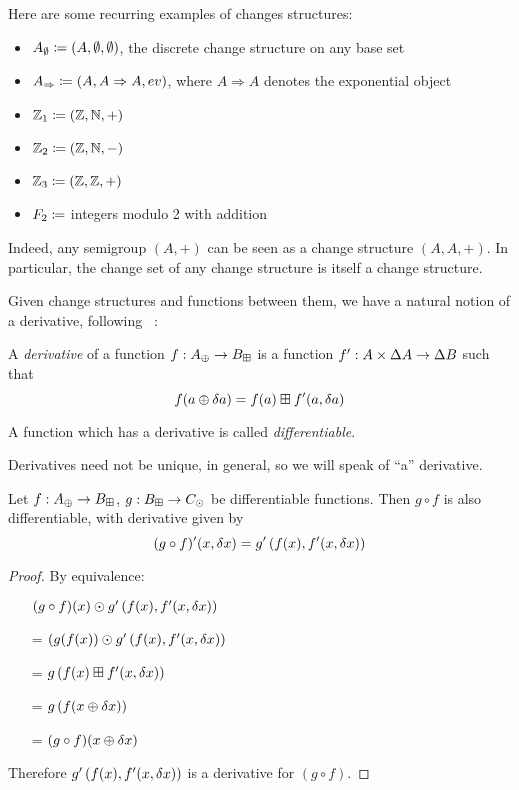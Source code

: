 Here are some recurring examples of changes structures:
\begin{itemize}
  \item $A_\emptyset \coloneqq (A,\emptyset,\emptyset)$, the discrete change structure on any base set
  \item $A_\Rightarrow \coloneqq (A,A\Rightarrow A,ev)$, where $A \Rightarrow A$ denotes the exponential object
  \item $\mathbb{Z}_1 \coloneqq (\mathbb{Z},\mathbb{N},+)$
  \item $\mathbb{Z}_2 \coloneqq (\mathbb{Z},\mathbb{N},-)$
  \item $\mathbb{Z}_3 \coloneqq (\mathbb{Z},\mathbb{Z},+)$
  \item $F_2 \coloneqq$ integers modulo 2 with addition
\end{itemize}
Indeed, any semigroup $(A, +)$ can be seen as a change structure $(A, A, +)$. In particular,
the change set of any change structure is itself a change structure.

Given change structures and functions between them, we have a natural notion of a derivative, following ~\cite{cai2014changes}:

\begin{defn}[Derivatives]
  A \textit{derivative} of a function $f: A_\oplus \rightarrow B_\boxplus$ is a function $f': A \times \Delta A \rightarrow
  \Delta B$ such that
  $$f(a \oplus \delta a) = f(a) \boxplus f'(a, \delta a)$$

  A function which has a derivative is called \textit{differentiable}.
\end{defn}

Derivatives need not be unique, in general, so we will speak of ``a''
derivative. 

\begin{thm}
  Let $f: A_\oplus \rightarrow B_\boxplus$, $g: B_\boxplus \rightarrow C_\odot$ be differentiable functions. Then $g \circ f$ is also
  differentiable, with derivative given by
   $$(g \circ f)'(x, \delta x) = g'\left(f(x), f'(x, \delta x)\right)$$
\end{thm}
\begin{proof}
  By equivalence:
  \begin{itemize}
    \item[ ]$(g \circ f)(x) \odot g'\left(f(x), f'(x,\delta x)\right)$
    \item[=]$(g(f(x)) \odot g'\left(f(x), f'(x,\delta x)\right)$
    \item[=]$g\left(f(x) \boxplus f'(x, \delta x) \right)$
    \item[=]$g\left(f(x \oplus \delta x)\right)$
    \item[=]$(g \circ f)(x \oplus \delta x)$
  \end{itemize}
  Therefore $g'\left(f(x), f'(x, \delta x)\right)$ is a
  derivative for $(g \circ f)$.
\end{proof}

